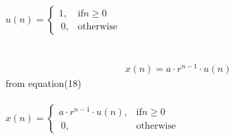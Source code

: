 \documentclass[journal,12pt,twocolumn]{IEEEtran}
\theoremstyle{remark}
\begin{document}
\\\\$u(n)=\begin{cases} 1,& \text{if} n\geq 0 \\\ 0,& \text{otherwise} \end{cases}$
\\\\\\\begin{align}x(n)=a\cdot r^{n-1}\cdot u(n)\end{align}
from equation(18)
\\\\$x(n)=\begin{cases} a\cdot r^{n-1} \cdot u(n),&\text{if} n \geq 0\\\ 0,& \text{otherwise}
\end{cases}$
\end{document}
